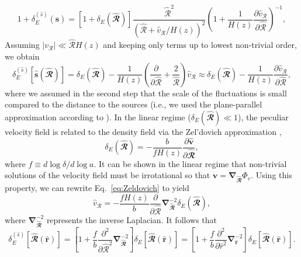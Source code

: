 \documentclass[numberedappendix]{emulateapj}
\newcommand{\calR}{\ensuremath{\bm\hat{\mathbfcal{R}}}}
\newcommand{\magcalR}{\ensuremath{\hat{\mathcal{R}}}}
\begin{document}
\begin{equation}
1+\delta_E^{(\hat s)}(\mathbf{\hat s}) = 
\left[1+\delta_E(\calR)\right] \frac{\magcalR^2}{\left(\magcalR +\hat{v}_{\mathcal{R}}/H(z)\right)^2}
\left(1+\frac{1}{H(z)}\frac{\partial \hat{v}_{\mathcal{R}}}{\partial\magcalR}\right)^{-1},
\label{eq:conservation2}
\end{equation}
Assuming $\left|v_{\mathcal{R}}\right|\ll \magcalR H(z)$ and keeping only terms up to lowest non-trivial order, we obtain
\begin{equation}
  \label{eq:real_vs_z}
  \delta_E^{(\hat s)}\left[\mathbf{\hat s}(\calR) \right]=
  \delta_E(\calR)-\frac{1}{H(z)}\left(\frac{\partial}{\partial \magcalR} + 
    \frac{2}{\magcalR}\right)\hat{v}_{\mathcal{R}}\approx
  \delta_E(\calR)-\frac{1}{H(z)}\frac{\partial \hat{v}_{\mathcal{R}}}{\partial \magcalR},
\end{equation}
where we assumed in the second step that the scale of the fluctuations is small compared to the distance to the sources (i.e., we used the plane-parallel approximation according to \citealt{1987MNRAS.227....1K}). In the linear regime ($\delta_E(\calR)\ll 1$), the peculiar velocity field is related to the density field via the Zel'dovich approximation \citep{MFW},
\begin{equation}
  \label{eq:Zeldovich}
  \delta_E(\calR) = -\frac{b}{f H(z)}\frac{\partial \bm\hat{\mathbf{v}}}{\partial \calR},
\end{equation}
where $f\equiv d\log\delta/d\log a$. It can be shown in the linear regime that non-trivial solutions of the velocity field must be irrotational so that $\mathbf{v} = \boldsymbol{\nabla}_{\calR} \Phi_v$. Using this property, we can rewrite Eq.~\eqref{eq:Zeldovich} to yield
\begin{equation}
  \label{eq:Zeldovich2}
  \hat{v}_{\mathcal{R}} = - \frac{f H(z)}{b} \frac{\partial}{\partial \magcalR} \boldsymbol{\nabla}_{\calR}^{-2}\delta_E(\calR),
\end{equation}
where $\boldsymbol{\nabla}_{\calR}^{-2}$ represents the inverse Laplacian. It follows that
\begin{equation}
  \label{eq:Zeldovich3}
  \delta_E^{(\hat s)}[\calR(\bm\hat{\mathbf{r}})] = 
  \left[1+\frac{f}{b}\frac{\partial^2}{\partial \magcalR^2}
    \boldsymbol{\nabla}_{\calR}^{-2}
\right]\delta_E[\calR(\bm\hat{\mathbf{r}})] =
  \left[1+\frac{f}{b}\frac{\partial^2}{\partial \hat{r}^2}
    \boldsymbol{\nabla}_{\bm\hat{\mathbf{r}}}^{-2}
\right]\delta_E[\calR(\bm\hat{\mathbf{r}})].
\end{equation}
\end{document}
